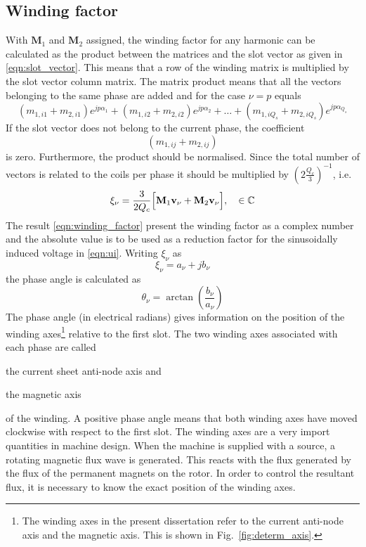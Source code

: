 \subsection{Winding factor}
With $\mathbf{M}_1$ and $\mathbf{M}_2$ assigned, the winding factor for any harmonic can be calculated as the product between the matrices and the slot vector as given in \eqref{eqn:slot_vector}. This means that a row of the winding matrix is multiplied by the slot vector column matrix. The matrix product means that all the vectors belonging to the same phase are added and for the case $\nu=p$ equals
\begin{equation}
  \label{eqn:m1_m2_exp}
  (m_{1,i1}+m_{2,i1})e^{jp\alpha_1}+(m_{1,i2}+m_{2,i2})e^{jp\alpha_2}+\ldots+
  (m_{1,iQ_s}+m_{2,iQ_s})e^{jp \alpha_{Q_s}}
\end{equation}
If the slot vector does not belong to the current phase, the coefficient
\begin{equation} 
  \left(m_{1,ij}+m_{2,ij}\right)
\end{equation} 
is zero. Furthermore, the product should be normalised. Since the total number of vectors is related to the coils per phase it should be multiplied by $\left(2\frac{Q_c}{3}\right)^{-1}$, i.e.
\begin{equation}
  \label{eqn:winding_factor}
  \xi_{\nu} = \frac{3}{2Q_c}
  \Bigl[
    \mathbf{M}_1\mathbf{v_{\nu}}+\mathbf{M}_2\mathbf{v_{\nu}}
  \Bigr], 
  \quad \in \mathbb{C}
\end{equation}
The result \eqref{eqn:winding_factor} present the winding factor as a complex number and the absolute value is to be used as a reduction factor for the sinusoidally induced voltage in \eqref{eqn:ui}. Writing $\xi_{\nu}$ as
\begin{equation}
  \xi_{\nu} = a_{\nu}+jb_{\nu}
\end{equation}
the phase angle is calculated as 
\begin{equation}
  \theta_{\nu} = \arctan\left(\frac{b_{\nu}}{a_{\nu}}\right)
\end{equation}
The phase angle (in electrical radians) gives information on the position of the winding axes\footnote{The winding axes in the present dissertation refer to the current anti-node axis and the magnetic axis. This is shown in Fig.~\ref{fig:determ_axis}.} relative to the first slot. The two winding axes associated with each phase are called
\begin{itemize*}
	\item the current sheet anti-node axis and
	\item the magnetic axis
\end{itemize*}
of the winding. A positive phase angle means that both winding axes have moved clockwise with respect to the first slot. The winding axes are a very import quantities in machine design. When the machine is supplied with a source, a rotating magnetic flux wave is generated. This reacts with the flux generated by the flux of the permanent magnets on the rotor. In order to control the resultant flux, it is necessary to know the exact position of the winding axes.  

